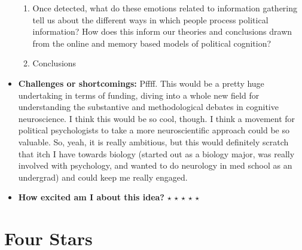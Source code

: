 \documentclass[12pt]{article}
\begin{document}
\begin{itemize}
\begin{enumerate}
            \item Once detected, what do these emotions related to information gathering tell us about the different ways in which people process political information? How does this inform our theories and conclusions drawn from the online and memory based models of political cognition?
            \item Conclusions
        \end{enumerate}
        \item \textbf{Challenges or shortcomings:} Pffff. This would be a pretty huge undertaking in terms of funding, diving into a whole new field for understanding the substantive and methodological debates in cognitive neuroscience. I think this would be so cool, though. I think a movement for political psychologists to take a more neuroscientific approach could be so valuable. So, yeah, it is really ambitious, but this would definitely scratch that itch I have towards biology (started out as a biology major, was really involved with psychology, and wanted to do neurology in med school as an undergrad) and could keep me really engaged.
        \item \textbf{How excited am I about this idea?} $\star$ $\star$ $\star$ $\star$ $\star$
    \end{itemize}
\section{Four Stars}
\end{document}
